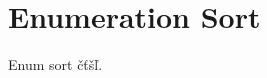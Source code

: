 \documentclass[a4paper,11pt]{article}
\begin{document}
\section{Enumeration Sort}
Enum sort čťšľ.
\end{document}
